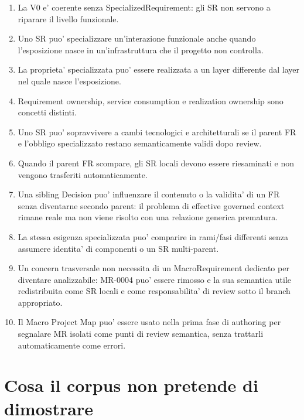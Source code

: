 \documentclass[11pt,a4paper]{article}
\begin{document}
\begin{enumerate}
  \item La V0 e' coerente senza SpecializedRequirement: gli SR non servono a riparare il livello funzionale.
  \item Uno SR puo' specializzare un'interazione funzionale anche quando l'esposizione nasce in un'infrastruttura che il progetto non controlla.
  \item La proprieta' specializzata puo' essere realizzata a un layer differente dal layer nel quale nasce l'esposizione.
  \item Requirement ownership, service consumption e realization ownership sono concetti distinti.
  \item Uno SR puo' sopravvivere a cambi tecnologici e architetturali se il parent FR e l'obbligo specializzato restano semanticamente validi dopo review.
  \item Quando il parent FR scompare, gli SR locali devono essere riesaminati e non vengono trasferiti automaticamente.
  \item Una sibling Decision puo' influenzare il contenuto o la validita' di un FR senza diventarne secondo parent: il problema di effective governed context rimane reale ma non viene risolto con una relazione generica prematura.
  \item La stessa esigenza specializzata puo' comparire in rami/fasi differenti senza assumere identita' di componenti o un SR multi-parent.
  \item Un concern trasversale non necessita di un MacroRequirement dedicato per diventare analizzabile: MR-0004 puo' essere rimosso e la sua semantica utile redistribuita come SR locali e come responsabilita' di review sotto il branch appropriato.
  \item Il Macro Project Map puo' essere usato nella prima fase di authoring per segnalare MR isolati come punti di review semantica, senza trattarli automaticamente come errori.
\end{enumerate}

\section{Cosa il corpus non pretende di dimostrare}
\end{document}
